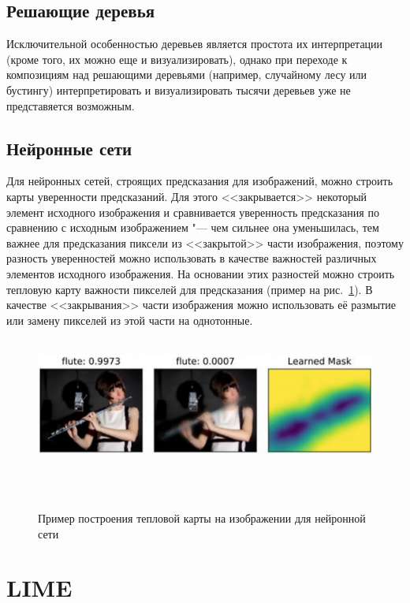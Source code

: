 \documentclass[12pt,a4paper]{article}
\begin{document}
\subsection{Решающие деревья}
	\par Исключительной особенностью деревьев является простота их интерпретации (кроме того, их можно еще и визуализировать), однако при переходе к композициям над решающими деревьями (например, случайному лесу или бустингу) интерпретировать и визуализировать тысячи деревьев уже не представяется возможным.
	
\subsection{Нейронные сети}
	\par Для нейронных сетей, строящих предсказания для изображений, можно строить карты уверенности предсказаний. Для этого <<закрывается>> некоторый элемент исходного изображения и сравнивается уверенность предсказания по сравнению с исходным изображением "--- чем сильнее она уменьшилась, тем важнее для предсказания пиксели из <<закрытой>> части изображения, поэтому разность уверенностей можно использовать в качестве важностей различных элементов исходного изображения. На основании этих разностей можно строить тепловую карту важности пикселей для предсказания (пример на рис.~\ref{neuro_heatmap}). В качестве <<закрывания>> части изображения можно использовать её размытие или замену пикселей из этой части на однотонные.

	\begin{center}
	\begin{figure}[!htb]
	 \centering
	 \includegraphics[width=1.0\linewidth]{neuro_heatmap.png}
	 \caption{Пример построения тепловой карты на изображении для нейронной сети}
	 \label{neuro_heatmap}
	\end{figure}
	\end{center}

\section{LIME}
\end{document}
